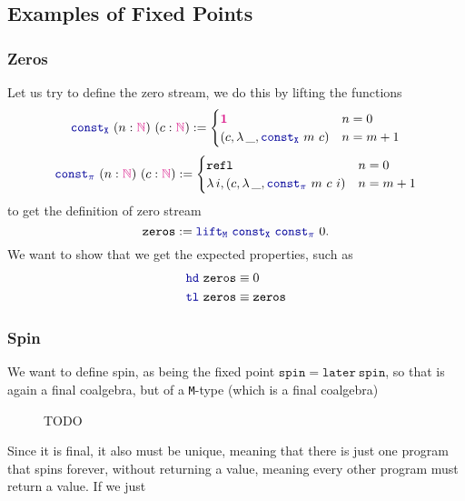 \documentclass[twoside,11pt,openright]{report}
\theoremstyle{plain} %
\theoremstyle{definition}
\theoremstyle{remark}
\newcommand*{\type}[1]{\textcolor{magenta!90!black}{#1}}
\newcommand*{\unit}{\type{\textbf{1}}}
\newcommand*{\function}[1]{\textcolor{blue!60!black}{\ensuremath{\mathtt{#1}}}}
\begin{document}
\subsection{Examples of Fixed Points}
\subsubsection{Zeros}
Let us try to define the zero stream, we do this by lifting the functions
\begin{equation}
  \function{const_X}~(n : \type{\mathbb{N}})~(c : \type{\mathbb{N}})  := \begin{cases} \unit & n = 0 \\ (c , \lambda\,\_, \function{const_X}~m~c) & n = m + 1 \end{cases}
\end{equation}
\begin{equation}
  \function{const_\pi}~(n : \type{\mathbb{N}})~(c : \type{\mathbb{N}}) := \begin{cases} \mathtt{refl} & n = 0 \\ \lambda\,i,(c , \lambda\,\_, \function{const_\pi}~m~c~i) & n = m + 1 \end{cases}
\end{equation}
to get the definition of zero stream
\begin{equation}
  \mathtt{zeros} := \function{lift_M}~\function{const_X}~\function{const_\pi}~0.
\end{equation}
We want to show that we get the expected properties, such as
\begin{align}
  \function{hd}~\mathtt{zeros} &\equiv 0 \\
  \function{tl}~\mathtt{zeros} &\equiv \mathtt{zeros}
\end{align}

\subsubsection{Spin}
We want to define spin, as being the fixed point \(\mathtt{spin} = \mathtt{later}~\mathtt{spin}\), so that is again a final coalgebra, but of a \texttt{M}-type (which is a final coalgebra)

\begin{figure}[h]
  \centering
  \caption{TODO}
\end{figure}
\noindent Since it is final, it also must be unique, meaning that there is just one program that spins forever, without returning a value, meaning every other program must return a value. If we just
\end{document}
